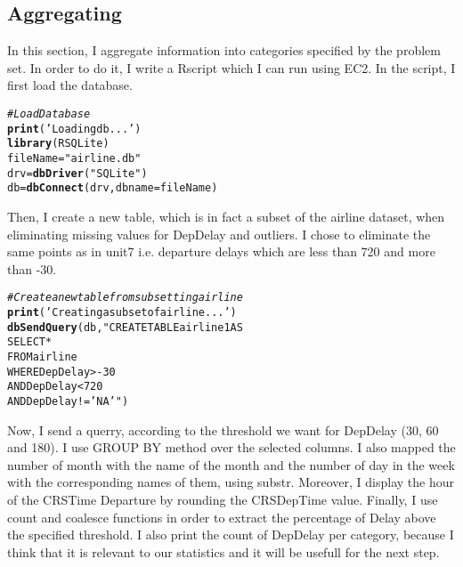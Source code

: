 \documentclass{llncs}\usepackage[]{graphicx}\usepackage[]{color}
\makeatletter
\newcommand{\hlstr}[1]{\textcolor[rgb]{0.192,0.494,0.8}{#1}}%
\newcommand{\hlcom}[1]{\textcolor[rgb]{0.678,0.584,0.686}{\textit{#1}}}%
\newcommand{\hlstd}[1]{\textcolor[rgb]{0.345,0.345,0.345}{#1}}%
\newcommand{\hlkwb}[1]{\textcolor[rgb]{0.69,0.353,0.396}{#1}}%
\newcommand{\hlkwc}[1]{\textcolor[rgb]{0.333,0.667,0.333}{#1}}%
\newcommand{\hlkwd}[1]{\textcolor[rgb]{0.737,0.353,0.396}{\textbf{#1}}}%
\newenvironment{kframe}{%
 \def\at@end@of@kframe{}%
 \ifinner\ifhmode%
  \def\at@end@of@kframe{\end{minipage}}%
  \begin{minipage}{\columnwidth}%
 \fi\fi%
 \def\FrameCommand##1{\hskip\@totalleftmargin \hskip-\fboxsep
 \colorbox{shadecolor}{##1}\hskip-\fboxsep
     \hskip-\linewidth \hskip-\@totalleftmargin \hskip\columnwidth}%
 \MakeFramed {\advance\hsize-\width
   \@totalleftmargin\z@ \linewidth\hsize
   \@setminipage}}%
 {\par\unskip\endMakeFramed%
 \at@end@of@kframe}
\newenvironment{knitrout}{}{} %
\makeatother
\begin{document}
\subsection{Aggregating}
In this section, I aggregate information into categories specified by the problem set. In order to do it, I write a Rscript which I can run using EC2. In the script, I first load the database.
\begin{knitrout}
\color{fgcolor}\begin{kframe}
\begin{alltt}
\hlcom{# Load Database}
\hlkwd{print}\hlstd{(}\hlstr{'Loading db...'}\hlstd{)}
\hlkwd{library}\hlstd{(RSQLite)}
\hlstd{fileName}\hlkwb{=}\hlstr{"airline.db"}
\hlstd{drv} \hlkwb{=} \hlkwd{dbDriver}\hlstd{(}\hlstr{"SQLite"}\hlstd{)}
\hlstd{db} \hlkwb{=} \hlkwd{dbConnect}\hlstd{(drv,} \hlkwc{dbname} \hlstd{= fileName)}
\end{alltt}
\end{kframe}
\end{knitrout}
Then, I create a new table, which is in fact a subset of the airline dataset, when eliminating missing values for DepDelay and outliers. I chose to eliminate the same points as in unit7 i.e. departure delays which are less than 720 and more than -30.
\begin{knitrout}
\color{fgcolor}\begin{kframe}
\begin{alltt}
\hlcom{# Create a new table from subsetting airline}
\hlkwd{print}\hlstd{(}\hlstr{'Creating a subset of airline...'}\hlstd{)}
\hlkwd{dbSendQuery}\hlstd{(db,} \hlstr{"CREATE TABLE airline1 AS 
            SELECT *
            FROM   airline
            WHERE  DepDelay > -30
            AND DepDelay < 720
            AND DepDelay != 'NA'"}\hlstd{)}
\end{alltt}
\end{kframe}
\end{knitrout}
Now, I send a querry, according to the threshold we want for DepDelay (30, 60 and 180). I use GROUP BY method over the selected columns. I also mapped the number of month with the name of the month and the number of day in the week with the corresponding names of them, using substr. Moreover, I display the hour of the CRSTime Departure by rounding the CRSDepTime value. Finally, I use count and coalesce functions in order to extract the percentage of Delay above the specified threshold. I also print the count of DepDelay per category, because I think that it is relevant to our statistics and it will be usefull for the next step. \\
\end{document}
